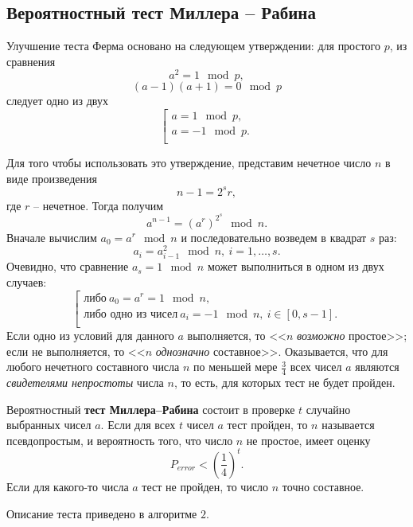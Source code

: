 \subsection{Вероятностный тест Миллера -- Рабина}

Улучшение теста Ферма основано на следующем утверждении: для простого $p$, из сравнения
    \[ a^2 = 1 \mod p, \]
    \[ (a-1)(a+1) = 0 \mod p \]
следует одно из двух
\[ \left[ \begin{array}{l}
     a = 1 \mod p, \\
     a = -1 \mod p. \\
\end{array} \right. \]

Для того чтобы использовать это утверждение, представим нечетное число $n$  в виде произведения
    \[ n-1 = 2^s r, \]
где $r$ -- нечетное. Тогда получим
    \[ a^{n-1} = (a^r)^{2^s} \mod n. \]
Вначале вычислим $a_0 = a^r \mod n$ и последовательно возведем в квадрат $s$ раз:
    \[ a_i = a_{i-1}^2 \mod n, ~ i = 1, \dots, s. \]
Очевидно, что сравнение $a_s = 1 \mod n$ может выполниться в одном из двух случаев:
\[ \left[ \begin{array}{l}
    \text{либо}~ a_0 = a^r = 1 \mod n, \\
    \text{либо одно из чисел}~ a_i = -1 \mod n, ~ i \in [0, s-1]. \\
\end{array} \right. \]
Если одно из условий для данного $a$  выполняется, то  <<$n$ \emph{возможно} простое>>; если не выполняется, то <<$n$ \emph{однозначно} составное>>. Оказывается, что для любого нечетного составного числа $n$ по меньшей мере $\frac{3}{4}$ всех чисел $a$ являются \emph{свидетелями непростоты} числа $n$, то есть, для которых тест не будет пройден.

Вероятностный \textbf{тест Миллера--Рабина} состоит в проверке $t$ случайно выбранных чисел $a$. Если для всех $t$ чисел $a$ тест пройден, то $n$ называется псевдопростым, и вероятность того, что число $n$ не простое, имеет оценку
    \[ P_{error} < \left( \frac{1}{4} \right)^t. \]
Если для какого-то числа $a$ тест не пройден, то число $n$ точно составное.

Описание теста приведено в алгоритме $2$.

